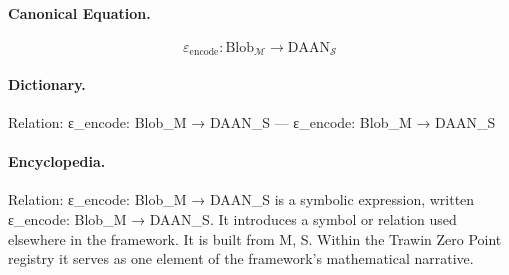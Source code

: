 \paragraph{Canonical Equation.}
\[
\varepsilon_{\text{encode}}: \text{Blob}_{\mathcal{M}} \to \text{DAAN}_{\mathcal{S}}
\]

\paragraph{Dictionary.}
Relation: ε\_encode: Blob\_M → DAAN\_S — ε\_encode: Blob\_M → DAAN\_S

\paragraph{Encyclopedia.}
Relation: ε\_encode: Blob\_M → DAAN\_S is a symbolic expression, written ε\_encode: Blob\_M → DAAN\_S. It introduces a symbol or relation used elsewhere in the framework. It is built from M, S. Within the Trawin Zero Point registry it serves as one element of the framework's mathematical narrative.
